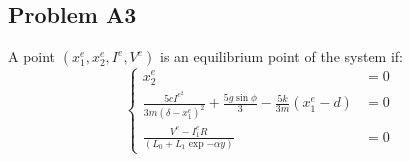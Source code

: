 \subsection*{Problem A3} 
\hfill \break
A point $(x_1^e, x_2^e, I^e, V^e)$ is an equilibrium point of the system if:
\hfill \break
\begin{equation}\label{eq:18}
    \begin{cases}
        x_2^e &= 0
        \\    
        \frac{5cI^e^2}{3m(\delta - x_1^e)^2} + \frac{5g\sin{\phi}}{3} - \frac{5k}{3m}(x_1^e -d) &= 0
        \\
        \frac{V^e - {I_1^e}R}{\left(L_{0} + L_{1}\exp{- \alpha y}\right)} &= 0
    \end{cases}
\end{equation}
